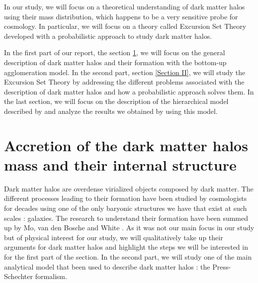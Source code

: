 In our study, we will focus on a theoretical understanding of dark matter halos using their mass distribution, which happens to be a very sensitive probe for cosmology. In particular, we will focus on a theory called Excursion Set Theory \cite{Bond} developed with a probabilistic approach to study dark matter halos.

In the first part of our report, the section \ref{Section I}, we will focus on the general description of dark matter halos and their formation with the bottom-up agglomeration model. In the second part, section \ref{Section II}, we will study the Excursion Set Theory by addressing the different problems associated with the description of dark matter halos and how a probabilistic approach solves them. In the last section, we will focus on the description of the hierarchical model described by \cite{LaC} and analyze the results we obtained by using this model.





\newpage
\section{Accretion of the dark matter halos mass and their internal structure}
\label{Section I}


Dark matter halos are overdense virialized objects composed by dark matter. The different processes leading to their formation have been studied by cosmologists for decades using one of the only baryonic structures we have that exist at such scales : galaxies. The research to understand their formation have been summed up by Mo, van den Bosche and White \cite{MBW}. As it was not our main focus in our study but of physical interest for our study, we will qualitatively take up their arguments for dark matter halos and highlight the steps we will be interested in for the first part of the section. In the second part, we will study one of the main analytical model that been used to describe dark matter halos : the Press-Schechter formalism.


